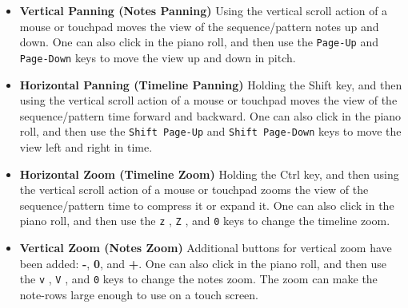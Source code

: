    \begin{itemize}
      \item \textbf{Vertical Panning (Notes Panning)}
         Using the vertical scroll action of a mouse or touchpad moves the
         view of the sequence/pattern notes up and down.
         One can also click in the piano roll, and then use the
         \texttt{Page-Up} 
         and \texttt{Page-Down} 
         keys to move the view up and down in pitch.
      \item \textbf{Horizontal Panning (Timeline Panning)}
         Holding the Shift key, and then using the vertical scroll action of a
         mouse or touchpad moves the view of the sequence/pattern time forward
         and backward.
         One can also click in the piano roll, and then use the
         \texttt{Shift Page-Up} 
         and \texttt{Shift Page-Down} 
         keys to move the view left and right in time.
      \item \textbf{Horizontal Zoom (Timeline Zoom)}
         Holding the Ctrl key, and then using the vertical scroll action of a
         mouse or touchpad zooms the view of the sequence/pattern time to
         compress it or expand it.
         One can also click in the piano roll, and then use the
         \texttt{z} ,
         \texttt{Z} , and
         \texttt{0}  keys to change the timeline zoom.
      \item \textbf{Vertical Zoom (Notes Zoom)}
         Additional buttons for vertical zoom have been added:
         \textbf{-},
         \textbf{0}, and
         \textbf{+}.
         One can also click in the piano roll, and then use the
         \texttt{v} ,
         \texttt{V} , and
         \texttt{0}  keys to change the notes zoom.
         The zoom can make the note-rows large enough to use on a touch screen.
   \end{itemize}

